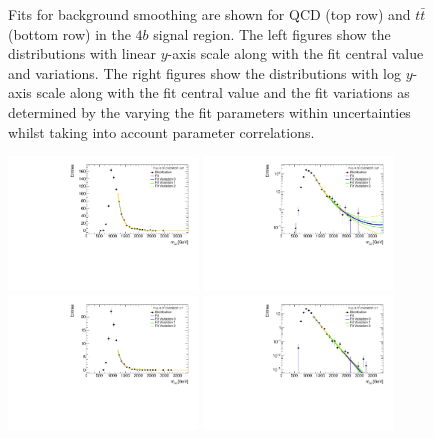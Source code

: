 \begin{figure}[htbp!]
\begin{center}
\caption{Fits for background smoothing are shown for QCD (top row) and $t\bar{t}$ (bottom row) in the $4b$ signal region.  The left figures show the distributions with linear $y$-axis scale along with the fit central value and variations. The right figures show the  distributions with log $y$-axis scale along with the fit central value and the fit variations as determined by the varying the fit parameters within uncertainties whilst taking into account parameter correlations. }
\label{fig:signal-region-4b-smoothing}
\end{center}
\end{figure}

\begin{figure}[htbp!]
\begin{center}
\includegraphics[angle=270, width=0.45\textwidth]{figures/boosted/Smooth/qcd_est_ThreeTag_Signal_mHH_l.pdf}
\includegraphics[angle=270, width=0.45\textwidth]{figures/boosted/Smooth/qcd_est_ThreeTag_Signal_mHH_l_l.pdf}\\  
\includegraphics[angle=270, width=0.45\textwidth]{figures/boosted/Smooth/ttbar_est_ThreeTag_Signal_mHH_l.pdf}
\includegraphics[angle=270, width=0.45\textwidth]{figures/boosted/Smooth/ttbar_est_ThreeTag_Signal_mHH_l_l.pdf}\\

\end{center}
\end{figure}
